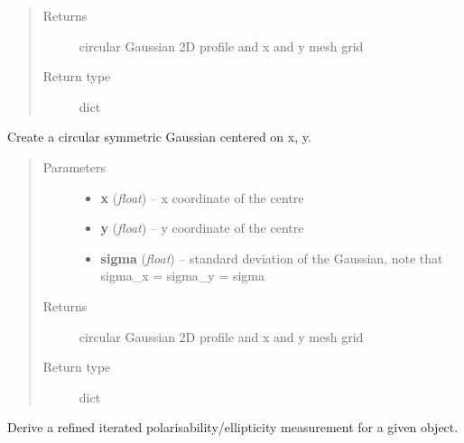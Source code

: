 \documentclass[a4paper,11pt,english]{sphinxmanual}
\begin{document}
\begin{fulllineitems}
\begin{fulllineitems}
\begin{quote}
\begin{description}
\item[{Returns}] \leavevmode
circular Gaussian 2D profile and x and y mesh grid

\item[{Return type}] \leavevmode
dict

\end{description}\end{quote}

\end{fulllineitems}


\begin{fulllineitems}
\label{analysis:analysis.shape.shapeMeasurement.circular2DGaussian}
Create a circular symmetric Gaussian centered on x, y.
\begin{quote}\begin{description}
\item[{Parameters}] \leavevmode\begin{itemize}
\item {} 
\textbf{x} (\emph{float}) -- x coordinate of the centre

\item {} 
\textbf{y} (\emph{float}) -- y coordinate of the centre

\item {} 
\textbf{sigma} (\emph{float}) -- standard deviation of the Gaussian, note that sigma\_x = sigma\_y = sigma

\end{itemize}

\item[{Returns}] \leavevmode
circular Gaussian 2D profile and x and y mesh grid

\item[{Return type}] \leavevmode
dict

\end{description}\end{quote}

\end{fulllineitems}


\begin{fulllineitems}
\label{analysis:analysis.shape.shapeMeasurement.measureRefinedEllipticity}
Derive a refined iterated polarisability/ellipticity measurement for a given object.


\end{fulllineitems}
\end{fulllineitems}
\end{document}
